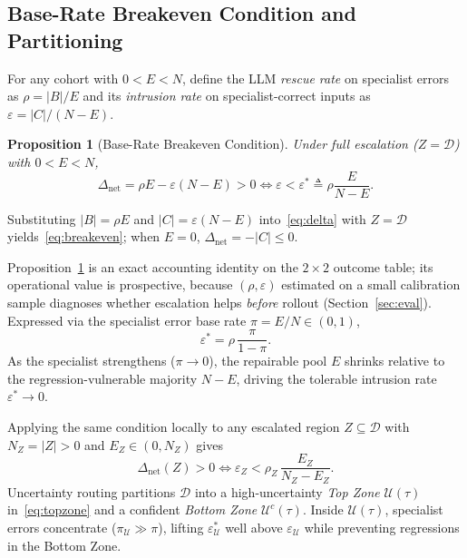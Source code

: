 \documentclass[conference,a4paper]{IEEEtran}
\newtheorem{proposition}{Proposition}
\newcommand{\eps}{\varepsilon}
\newcommand{\epsstar}{\eps^{\ast}}
\newcommand{\rrescue}{\rho}
\begin{document}
\subsection{Base-Rate Breakeven Condition and Partitioning}
For any cohort with $0 < E < N$, define the LLM \emph{rescue rate} on specialist
errors as $\rrescue = |B|/E$ and its \emph{intrusion rate} on specialist-correct
inputs as $\eps = |C|/(N-E)$.

\begin{proposition}[Base-Rate Breakeven Condition]
\label{thm:breakeven}
Under full escalation ($Z=\mathcal{D}$) with $0 < E < N$,
\begin{equation}
\Delta_{\mathrm{net}} = \rrescue E - \eps(N{-}E) > 0 \iff \eps < \epsstar \triangleq \rrescue\frac{E}{N{-}E}.
\label{eq:breakeven}
\end{equation}
\end{proposition}
\begin{IEEEproof}
Substituting $|B|=\rrescue E$ and $|C|=\eps(N-E)$ into~\eqref{eq:delta} with
$Z=\mathcal{D}$ yields~\eqref{eq:breakeven}; when $E=0$,
$\Delta_{\mathrm{net}}=-|C|\le 0$.
\end{IEEEproof}
Proposition~\ref{thm:breakeven} is an exact accounting identity on the $2\times2$
outcome table; its operational value is prospective, because $(\rrescue,\eps)$
estimated on a small calibration sample diagnoses whether escalation helps \emph{before}
rollout (Section~\ref{sec:eval}).
Expressed via the specialist error base rate $\pi = E/N \in (0, 1)$,
\begin{equation}
\epsstar = \rrescue\,\frac{\pi}{1-\pi}.
\label{eq:baserate}
\end{equation}
As the specialist strengthens ($\pi \to 0$), the repairable pool $E$ shrinks relative
to the regression-vulnerable majority $N-E$, driving the tolerable intrusion rate
$\epsstar \to 0$.

Applying the same condition locally to any escalated region $Z \subseteq \mathcal{D}$
with $N_Z = |Z| > 0$ and $E_Z \in (0, N_Z)$ gives
\begin{equation}
\Delta_{\mathrm{net}}(Z) > 0 \iff \eps_Z < \rrescue_Z\,\frac{E_Z}{N_Z - E_Z}.
\label{eq:local_breakeven}
\end{equation}
Uncertainty routing partitions $\mathcal{D}$ into a high-uncertainty \emph{Top Zone}
$\mathcal{U}(\tau)$ in~\eqref{eq:topzone} and a confident \emph{Bottom Zone}
$\mathcal{U}^c(\tau)$. Inside $\mathcal{U}(\tau)$, specialist errors concentrate
($\pi_{\mathcal{U}} \gg \pi$), lifting $\epsstar_{\mathcal{U}}$ well above
$\eps_{\mathcal{U}}$ while preventing regressions in the Bottom Zone.
\end{document}
